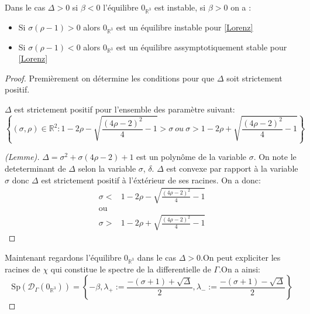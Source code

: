 \documentclass{article}
\newcommand{\R}{\mathbb{R}}
\newtheorem[M , nocut]{prop}{Proposition}[section]
\newtheorem[S , nocut]{definition}{Définition}
\newtheorem[S , nocut]{lemme}{Lemme}
\newtheorem[L , nocut]{thm}{Théoreme}
\newtheorem[L , nocut]{cor}{Corollaire}
\begin{document}
\begin{prop}
    Dans le cas $\Delta>0$ si $\beta<0$ l'équilibre $0_{\R^3}$ est instable, si $\beta >0$ on a :
    \begin{itemize}
        \item Si $\sigma(\rho-1)>0$ alors $0_{\R^3}$ est un équilibre instable pour \eqref{Lorenz}
        \item Si $\sigma(\rho-1)<0$ alors $0_{\R^3}$ est un équilibre assymptotiquement stable pour \eqref{Lorenz}
    \end{itemize}
\end{prop}

\begin{proof}
    Premièrement on détermine les conditions pour que $\Delta$ soit strictement positif.
    \begin{lemme}
        $\Delta$ est strictement positif pour l'ensemble des paramètre suivant:
        \[
         \left\{(\sigma,\rho)\in \R ^2 : 1-2 \rho - \sqrt{\frac{(4\rho-2)^2}{4} -1 } > \sigma\ ou \ \sigma > 1-2 \rho + \sqrt{ \frac{(4\rho-2)^2}{4} -1  } \right\}    
        \]
    \end{lemme}
    
        \begin{proof}[(Lemme)]
            $\Delta = \sigma^2 + \sigma(4\rho-2) + 1$ est un polynôme de la variable $\sigma$. On note le deteterminant de $\Delta$ selon la variable $\sigma$, $\delta$. $\Delta$ est convexe par rapport à la variable $\sigma$ donc $\Delta$ est strictement positif à l'éxtérieur de ses racines. On a donc:
            \begin{align*}
                \sigma <& 1-2 \rho - \sqrt{\frac{(4\rho-2)^2}{4} -1 }\\
                \text{ou}\\
                \sigma >& 1-2 \rho + \sqrt{\frac{(4\rho-2)^2}{4} -1 }
            \end{align*}
        \end{proof}
        
    Maintenant regardons l'équilibre $0_{\R^3}$ dans le cas $\Delta> 0$.On peut expliciter les racines de $\chi$ qui constitue le spectre de la differentielle de $\Gamma$.On a ainsi:
    \[
        \mathrm{Sp}(\mathcal{D}_\Gamma (0_{\R^3}))= \left\{-\beta,\lambda_+ := \frac{-(\sigma+1) + \sqrt{\Delta}}{2},\lambda_- := \frac{-(\sigma+1) - \sqrt{\Delta}}{2}\right\}  
    \]


\end{proof}
\end{document}
